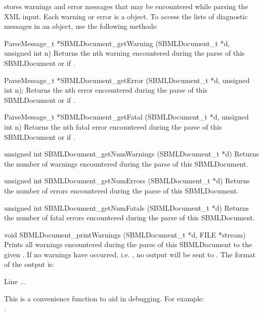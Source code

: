 \documentclass{sbmlmanual}
\begin{document}
\libsbml{} stores warnings and error messages that may be encountered while
parsing the XML input.  Each warning or error is a 
object.  To access the lists of diagnostic messages in an
 object, use the following methods:


\begin{methoddef}{ParseMessage\_t *SBMLDocument\_getWarning
(SBMLDocument\_t *d, unsigned int n)}
   Returns the nth warning encountered during the parse of this
   SBMLDocument or  if .
 \end{methoddef}

\begin{methoddef}{ParseMessage\_t *SBMLDocument\_getError (SBMLDocument\_t *d,
unsigned int n);}
   Returns the nth error encountered during the parse of this
   SBMLDocument or  if .
 \end{methoddef}

\begin{methoddef}{ParseMessage\_t *SBMLDocument\_getFatal (SBMLDocument\_t *d,
unsigned int n)}
   Returns the nth fatal error encountered during the parse of this
   SBMLDocument or  if .
 \end{methoddef}


\begin{methoddef}{unsigned int SBMLDocument\_getNumWarnings
(SBMLDocument\_t *d)}
   Returns the number of warnings encountered during the parse of this
   SBMLDocument.
 \end{methoddef}

\begin{methoddef}{unsigned int SBMLDocument\_getNumErrors (SBMLDocument\_t *d)}
   Returns the number of errors encountered during the parse of this
   SBMLDocument.
 \end{methoddef}

\begin{methoddef}{unsigned int SBMLDocument\_getNumFatals (SBMLDocument\_t *d)}
   Returns the number of fatal errors encountered during the parse of this
   SBMLDocument.
 \end{methoddef}
  

\begin{methoddef}{void SBMLDocument\_printWarnings (SBMLDocument\_t *d,
FILE *stream)}
  Prints all warnings encountered during the parse of this SBMLDocument to
  the given .  If no warnings have occurred, i.e.
  , no output will be sent to
  . The format of the output is:
  \begin{example}
      Line %
      ...
  \end{example}
  This is a convenience function to aid in debugging.  For example:\\
  .
 \end{methoddef}
  
\end{document}

